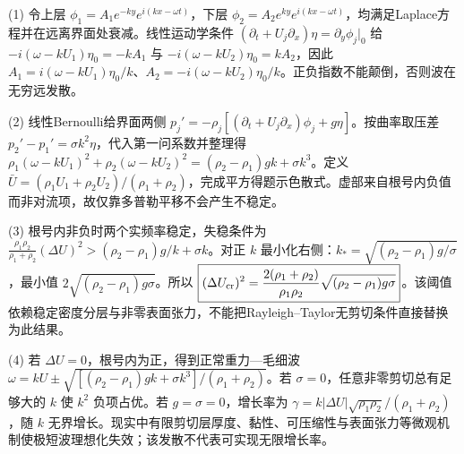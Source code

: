 (1) 令上层 \(\phi_1=A_1e^{-ky}e^{i(kx-\omega t)}\)，下层 \(\phi_2=A_2e^{ky}e^{i(kx-\omega t)}\)，均满足Laplace方程并在远离界面处衰减。线性运动学条件 \((\partial_t+U_j\partial_x)\eta=\partial_y\phi_j|_0\) 给 \(-i(\omega-kU_1)\eta_0=-kA_1\) 与 \(-i(\omega-kU_2)\eta_0=kA_2\)，因此 \(A_1=i(\omega-kU_1)\eta_0/k\)、\(A_2=-i(\omega-kU_2)\eta_0/k\)。正负指数不能颠倒，否则波在无穷远发散。

(2) 线性Bernoulli给界面两侧 \(p_j'=-\rho_j[(\partial_t+U_j\partial_x)\phi_j+g\eta]\)。按曲率取压差 \(p_2'-p_1'=\sigma k^2\eta\)，代入第一问系数并整理得 \(\rho_1(\omega-kU_1)^2+\rho_2(\omega-kU_2)^2=(\rho_2-\rho_1)gk+\sigma k^3\)。定义 \(\bar U=(\rho_1U_1+\rho_2U_2)/(\rho_1+\rho_2)\)，完成平方得题示色散式。虚部来自根号内负值而非对流项，故仅靠多普勒平移不会产生不稳定。

(3) 根号内非负时两个实频率稳定，失稳条件为 \(\frac{\rho_1\rho_2}{\rho_1+\rho_2}(\Delta U)^2>(\rho_2-\rho_1)g/k+\sigma k\)。对正 \(k\) 最小化右侧：\(k_*=\sqrt{(\rho_2-\rho_1)g/\sigma}\)，最小值 \(2\sqrt{(\rho_2-\rho_1)g\sigma}\)。所以 \(\boxed{(\Delta U_{\rm cr})^2=\frac{2(\rho_1+\rho_2)}{\rho_1\rho_2}\sqrt{(\rho_2-\rho_1)g\sigma}}\)。该阈值依赖稳定密度分层与非零表面张力，不能把Rayleigh–Taylor无剪切条件直接替换为此结果。

(4) 若 \(\Delta U=0\)，根号内为正，得到正常重力—毛细波 \(\omega=kU\pm\sqrt{[(\rho_2-\rho_1)gk+\sigma k^3]/(\rho_1+\rho_2)}\)。若 \(\sigma=0\)，任意非零剪切总有足够大的 \(k\) 使 \(k^2\) 负项占优。若 \(g=\sigma=0\)，增长率为 \(\gamma=k|\Delta U|\sqrt{\rho_1\rho_2}/(\rho_1+\rho_2)\)，随 \(k\) 无界增长。现实中有限剪切层厚度、黏性、可压缩性与表面张力等微观机制使极短波理想化失效；该发散不代表可实现无限增长率。

